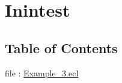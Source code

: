 \chapter*{Inintest}
\hypertarget{ecldoc:toc:Inintest}{}


\section*{Table of Contents}
file : \hyperlink{ecldoc:toc:Inintest.Example_3}{Example\_3.ecl}   \\


